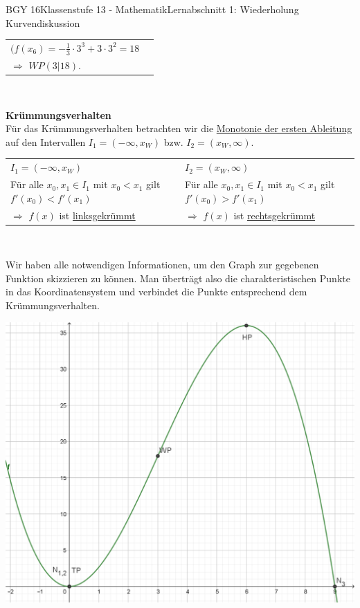 \documentclass[oneside,openany,headings=optiontotoc,11pt,numbers=noenddot]{scrreprt}
\begin{document}
\begin{worksheet}{BGY 16}{Klassenstufe 13 - Mathematik}{Lernabschnitt 1: Wiederholung Kurvendiskussion}
\begin{framed}
			\begin{tabularx}{\textwidth}{ll}
				\\
				\((f(x_6) = -\frac{1}{3}\cdot{}3^3 +3\cdot{}3^2 = 18\)\\
				\(\Rightarrow\) \colorbox{green!10}{\(WP(3|18)\)}.\\
			\end{tabularx}\\
			\par\noindent
			\textbf{Krümmungsverhalten}\\
			Für das Krümmungsverhalten betrachten wir die \underline{Monotonie der ersten Ableitung} auf den Intervallen \(I_1 = \left(-\infty,x_W\right)\) bzw. \(I_2 = \left(x_W,\infty\right)\).\\
			\par\noindent
			\begin{tabularx}{\textwidth}{X|X}
				\(I_1 = \left(-\infty,x_W\right)\) & \(I_2 = \left(x_W,\infty\right)\)\\
				Für alle \(x_0,x_1 \in I_1\) mit \(x_0 < x_1\) gilt \(f'(x_0) < f'(x_1)\) & Für alle \(x_0,x_1 \in I_1\) mit \(x_0 < x_1\) gilt \(f'(x_0) > f'(x_1)\)\\
				\(\Rightarrow\) \colorbox{green!10}{\(f(x)\) ist \underline{linksgekrümmt}} & \(\Rightarrow\) \colorbox{green!10}{\(f(x)\) ist \underline{rechtsgekrümmt}}
			\end{tabularx}\\
			\par\noindent
			Wir haben alle notwendigen Informationen, um den Graph zur gegebenen Funktion skizzieren zu können. Man überträgt also die charakteristischen Punkte in das Koordinatensystem und verbindet die Punkte entsprechend dem Krümmungsverhalten.\\
			\begin{center}
				\includegraphics[width=\textwidth]{../99_Bilder/LSG3.png}

\end{center}
\end{framed}
\end{worksheet}
\end{document}
